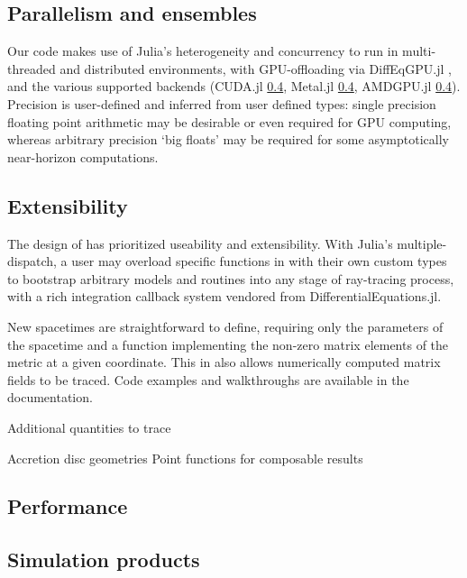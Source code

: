 \subsection{Parallelism and ensembles}

Our code makes use of Julia's heterogeneity and concurrency to run in multi-threaded and distributed environments, with GPU-offloading via DiffEqGPU.jl \citep{}, and the various supported backends (CUDA.jl \ref{}, Metal.jl \ref{}, AMDGPU.jl \ref{}). Precision is user-defined and inferred from user defined types: single precision floating point arithmetic may be desirable or even required for GPU computing, whereas arbitrary precision `big floats' may be required for some asymptotically near-horizon computations.



\subsection{Extensibility}

The design of \Gradus has prioritized useability and extensibility. With Julia's multiple-dispatch, a user may overload specific functions in \Gradus with their own custom types to bootstrap arbitrary models and routines into any stage of ray-tracing process, with a rich integration callback system vendored from DifferentialEquations.jl.

New spacetimes are straightforward to define, requiring only the parameters of the spacetime and a function implementing the non-zero matrix elements of the metric at a given coordinate. This in also allows numerically computed matrix fields to be traced. Code examples and walkthroughs are available in the \Gradus documentation.



Additional quantities to trace

Accretion disc geometries
Point functions for composable results


\subsection{Performance}
\label{sec:performance}


\subsection{Simulation products}



